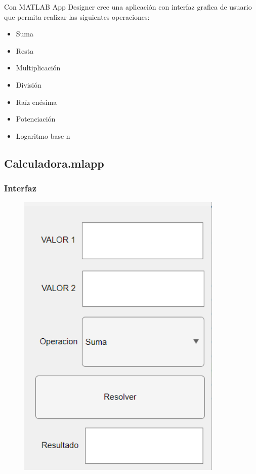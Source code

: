 \documentclass{article}
\begin{document}
	Con MATLAB App Designer cree una aplicación con interfaz grafica de usuario que permita realizar las siguientes operaciones:
	
	\begin{itemize}
		\item Suma
		\item Resta
		\item Multiplicación
		\item División
		\item Raíz enésima
		\item Potenciación
		\item Logaritmo base n
	\end{itemize}
	
	\subsection{Calculadora.mlapp}
	
	\subsubsection{Interfaz}
	
	\begin{figure}[h]
		\centering
		\includegraphics[height = 14cm]{img1.png}
	\end{figure}
	
\end{document}
